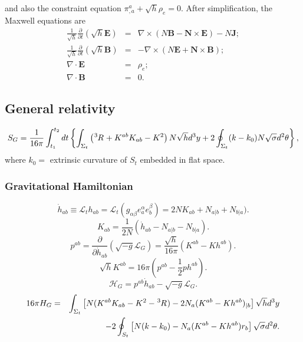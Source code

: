 \begin{example}
and also the constraint equation $\pi^a_{,a} + \sqrt{h}\rho_e = 0$.
After simplification, the Maxwell equations are
\begin{eqnarray}
\frac{1}{\sqrt{h}}\frac{\partial}{\partial t}(\sqrt{h} \bm{E}) &=& \nabla \times (N \bm{B} - \bm{N} \times \bm{E}) - N \bm{J}; \nonumber \\
\frac{1}{\sqrt{h}}\frac{\partial}{\partial t}(\sqrt{h} \bm{B}) &=& -\nabla \times (N \bm{E} + \bm{N} \times \bm{B}) ;\nonumber \\
\nabla \cdot \bm{E} &=& \rho_e ;\nonumber \\
\nabla \cdot \bm{B} &=& 0. \nonumber
\end{eqnarray}
\end{example}


\subsection{General relativity}
\[S_G = \frac{1}{16 \pi} \int_{t_1}^{t_2} dt \left\{ \int_{\Sigma_t} \left(\tensor[^3]{R}{} + K^{ab}K_{ab} -K^2 \right) N \sqrt{h} d^3 y + 2\oint_{\Sigma_t}(k-k_0)N \sqrt{\sigma}d^2 \theta \right\} ,\]
where $k_0 =$ extrinsic curvature of $S_t$ embedded in flat space. 

\subsubsection{Gravitational Hamiltonian}
\[\dot{h}_{ab} \equiv \mathcal{L}_t h_{ab} = \mathcal{L}_t (g_{\alpha \beta} e_a^{\alpha} e_b^{\beta}) =  2NK_{ab} + N_{a|b} + N_{b|a}).\]
\[K_{ab} = \frac{1}{2N} (\dot{h}_{ab} - N_{a|b} - N_{b|a}).\]
\[p^{ab} = \frac{\partial}{\partial \dot{h}_{ab}} (\sqrt{-g} \mathcal{L}_G) = \frac{\sqrt{h}}{16\pi} (K^{ab} - K h^{ab}).\]
\[\sqrt{h}K^{ab} = 16\pi (p^{ab} - \frac{1}{2}ph^{ab}).\]
\[\mathcal{H}_G = p^{ab}\dot{h}_{ab} - \sqrt{-g} \mathcal{L}_G.\]
\begin{eqnarray}
16\pi H_G &=& \int_{\Sigma_t} \left[ N(K^{ab}K_{ab} - K^2 - \tensor[^3]{R}{}) - 2N_a(K^{ab} - Kh^{ab})_{|b} \right] \sqrt{h} d^3 y 
\nonumber \\
&\phantom{=}& -2\oint_{S_t} \left[ N(k-k_0) - N_a(K^{ab}-Kh^{ab})r_b \right] \sqrt{\sigma} d^2 \theta .\nonumber
\end{eqnarray}

